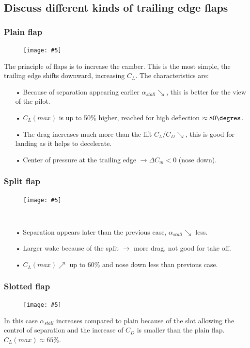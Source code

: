 \documentclass[british,french,11pt, a4paper, openany]{article}
\newcommand{\wrapfig}[6]{%
	\begin{figure}%
		\vspace{-5mm}%
		\texttt{[image: \#5]}%
		\captionof{figure}{}%
		\label{#6}%
	\end{figure}%
}
\begin{document}
\subsection{Discuss different kinds of trailing edge flaps}

\subsubsection{Plain flap}
\wrapfig{4}{r}{5}{0.1}{ch5/1}{ch5/1}
The principle of flaps is to increase the camber. This is the most simple, the trailing edge shifts downward, increasing $C_L$. The characteristics are: 
\begin{itemize}
	\item[•] Because of separation appearing earlier $\alpha _{stall} \searrow$, this is better for the view of the pilot. 
	\item[•] $C_L(max)$ is up to 50\% higher, reached for high deflection $\approx 80\degres$.
	\item[•] The drag increases much more than the lift $C_L/C_D \searrow$, this is good for landing as it helps to decelerate.
	\item[•] Center of pressure at the trailing edge $\rightarrow \Delta C_m<0$ (nose down). 
\end{itemize}

\subsubsection{Split flap}
\wrapfig{3}{r}{3}{0.15}{ch5/2}{ch5/2} \ \\
\begin{itemize}
	\item[•] Separation appears later than the previous case, $\alpha _{stall} \searrow$ less. 
	\item[•] Larger wake because of the split $\rightarrow$ more drag, not good for take off. 
	\item[•] $C_L(max) \nearrow$ up to 60\% and nose down less than previous case. 
\end{itemize}

\subsubsection{Slotted flap}
\wrapfig{5}{l}{4}{0.1}{ch5/3}{ch5/3}
In this case $\alpha _{stall}$ increases compared to plain because of the slot allowing the control of separation and the increase of $C_D$ is smaller than the plain flap. $C_L(max) \approx 65\%$.
\end{document}
